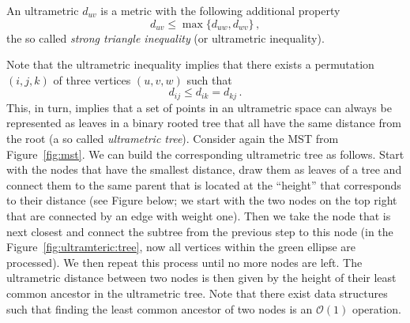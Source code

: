 \begin{definition*}
  An ultrametric $d_{uv}$ is a metric with the following additional property
  \begin{equation*}
    d_{uv} \le \max\{ d_{uw}, d_{wv}\}\,,
  \end{equation*}
  the so called \emph{strong triangle inequality} (or ultrametric inequality).
\end{definition*}
Note that the ultrametric inequality implies that there exists a permutation
$(i,j,k)$ of three vertices $(u,v,w)$ such that
\begin{equation*}
  d_{ij} \le d_{ik} = d_{kj}\,.
\end{equation*}
This, in turn, implies that a set of points in an ultrametric space can always
be represented as leaves in a binary rooted tree that all have the same distance
from the root (a so called \emph{ultrametric tree}). Consider again the MST from
Figure~\ref{fig:mst}. We can build the corresponding ultrametric tree as
follows. Start with the nodes that have the smallest distance, draw them as
leaves of a tree and connect them to the same parent that is located at the
``height'' that corresponds to their distance (see Figure below; we start with
the two nodes on the top right that are connected by an edge with weight
one). Then we take the node that is next closest and connect the subtree from
the previous step to this node (in the Figure~\ref{fig:ultramteric:tree}, now
all vertices within the green ellipse are processed). We then repeat this
process until no more nodes are left. The ultrametric distance between two nodes
is then given by the height of their least common ancestor in the ultrametric
tree. Note that there exist data structures such that finding the least common
ancestor of two nodes is an $\mathcal{O}(1)$ operation.

